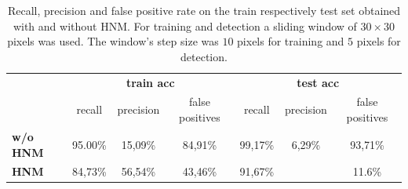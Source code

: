 \documentclass[12pt,a4paper,bibliography=totocnumbered,listof=totocnumbered]{scrartcl}
\begin{document}
\begin{table}[H]
\centering
\caption{Recall, precision and false positive rate on the train respectively test set obtained with and without HNM. For training and detection a sliding window of $30 \times 30$ pixels was used. The window's step size was $10$ pixels for training and $5$ pixels for detection.}
\small
  \begin{tabular}{l | c c c c c c}
  	  & 
      \multicolumn{3}{c}{\textbf{train acc}} &
      \multicolumn{3}{c}{\textbf{test acc}} \\
    & recall & precision & false positives & recall & precision & false positives \\ \toprule
    \textbf{w/o HNM} & 95.00\% & 15,09\% & 84,91\% & 99,17\% &6,29\% & 93,71\% \\
    \textbf{HNM}  & 84,73\% & 56,54\% & 43,46\% & 91,67\% & & 11.6\% \\
  \end{tabular}
  \label{tab:perf}
\end{table}
\end{document}
